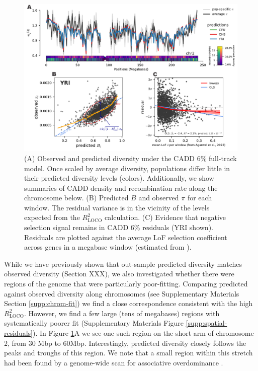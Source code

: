\documentclass[11pt]{article}
\begin{document}
\begin{figure}[htbp] \centering
    \includegraphics[width=\textwidth]{figures/figure_5.pdf} 

    \caption{(A) Observed and predicted diversity under the CADD 6\% full-track
        model. Once scaled by average diversity, populations differ little in
        their predicted diversity levels (colors). Additionally, we show
        summaries of CADD density and recombination rate along the chromosome
        below. (B) Predicted $B$ and observed $\pi$ for each window. The
        residual variance is in the vicinity of the levels expected from the
        $R_\text{LOCO}^2$ calculation. (C) Evidence that negative selection
    signal remains in CADD 6\% residuals (YRI shown). Residuals are plotted
against the average LoF selection coefficient across genes in a megabase window
(estimated from \cite{Agarwal2023-un}).}

  \label{fig:figure-5}
\end{figure}

While we have previously shown that out-sample predicted diversity matches
observed diversity (Section XXX), we also investigated whether there were
regions of the genome that were particularly poor-fitting. Comparing predicted
against observed diversity along chromosomes (see Supplementary Materials
Section \ref{supp:chrom-fit}) we find a close correspondence consistent with
the high $R_\text{LOCO}^2$. However, we find a few large (tens of megabases)
regions with systematically poorer fit (Supplementary Materials Figure
\ref{supp:spatial-residuals}). In Figure \ref{fig:figure-5}A we see one such
region on the short arm of chromosome 2, from 30 Mbp to 60Mbp. Interestingly,
predicted diversity closely follows the peaks and troughs of this region. We
note that a small region within this stretch had been found by a genome-wide
scan for associative overdominance \parencite{Gilbert2020-aw}.  
\end{document}
